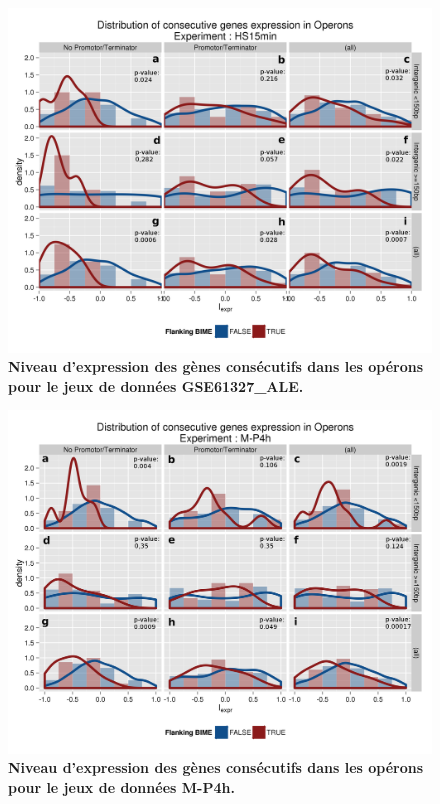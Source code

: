 \documentclass[12pt,a4paper]{report}
\begin{document}
\chapter{}
\label{annexeOperon}
\begin{figure}[h!]
\centerline{\includegraphics[scale=0.7]{figures/supData/genesOperon_histoDens_HS15.png}}
\caption{\textbf{Niveau d'expression des gènes consécutifs dans les opérons pour le jeux de données GSE61327\_ALE.}}
\end{figure}

\begin{figure}[!h]
\centerline{\includegraphics[scale=0.7]{figures/supData/genesOperon_histoDens_M-P4h.png}}
\caption{\textbf{Niveau d'expression des gènes consécutifs dans les opérons pour le jeux de données M-P4h.}}
\end{figure}
\end{document}
